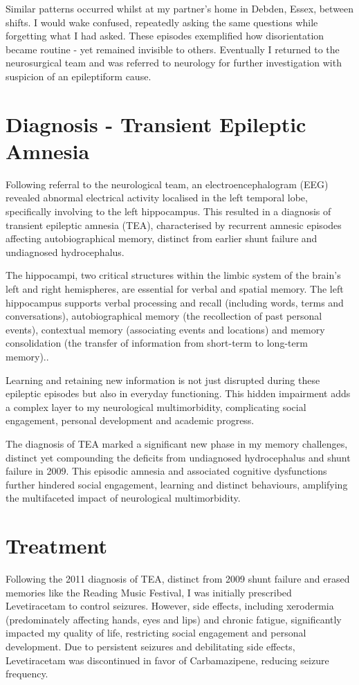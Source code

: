 \documentclass{article}
\begin{document}
Similar patterns occurred whilst at my partner’s home in Debden, Essex, between shifts. I would wake confused, repeatedly asking the same questions while forgetting what I had asked. These episodes exemplified how disorientation became routine - yet remained invisible to others. Eventually I returned to the neurosurgical team and was referred to neurology for further investigation with suspicion of an epileptiform cause.

\section*{Diagnosis - Transient Epileptic Amnesia}
Following referral to the neurological team, an electroencephalogram (EEG) revealed abnormal electrical activity localised in the left temporal lobe, specifically involving to the left hippocampus. This resulted in a diagnosis of transient epileptic amnesia (TEA), characterised by recurrent amnesic episodes affecting autobiographical memory, distinct from earlier shunt failure and undiagnosed hydrocephalus.\cite{zeman1998,butler2007}

The hippocampi, two critical structures within the limbic system of the brain's left and right hemispheres, are essential for verbal and spatial memory. The left hippocampus supports verbal processing and recall (including words, terms and conversations), autobiographical memory (the recollection of past personal events), contextual memory (associating events and locations) and memory consolidation (the transfer of information from short-term to long-term memory).\cite{squire1992,burgess2002}.

Learning and retaining new information is not just disrupted during these epileptic episodes but also in everyday functioning. This hidden impairment adds a complex layer to my neurological multimorbidity, complicating social engagement, personal development and academic progress.\cite{squire1992,zeman2010}

The diagnosis of TEA marked a significant new phase in my memory challenges, distinct yet compounding the deficits from undiagnosed hydrocephalus and shunt failure in 2009. This episodic amnesia and associated cognitive dysfunctions further hindered social engagement, learning and distinct behaviours, amplifying the multifaceted impact of neurological multimorbidity.\cite{zeman2010,miskin2020}

\section*{Treatment}
Following the 2011 diagnosis of TEA, distinct from 2009 shunt failure and erased memories like the Reading Music Festival, I was initially prescribed Levetiracetam to control seizures. However, side effects, including xerodermia (predominately affecting hands, eyes and lips) and chronic fatigue, significantly impacted my quality of life, restricting social engagement and personal development\cite{patsalos2000,mula2013}. Due to persistent seizures and debilitating side effects, Levetiracetam was discontinued in favor of Carbamazipene, reducing seizure frequency.
\end{document}
